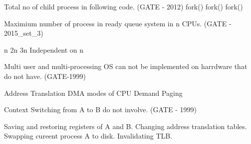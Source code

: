 
\begin{questyle}

  \question  Total no of child process in following code. (GATE - 2012) \newline
    fork()  \newline fork()  \newline  fork()

  \begin{oneparchoices}
  \end{oneparchoices}

\end{questyle}




\begin{questyle}

  \question Maximium number of process in ready queue system in n CPUs. (GATE - 2015\_set\_3)

  \begin{oneparchoices}
    \choice n
    \choice 2n
    \choice 3n
    \choice Independent on n
  \end{oneparchoices}

\end{questyle}





\begin{questyle}

  \question  Multi user and multi-processing OS can not be implemented on harrdware that do not have. (GATE-1999)

  \begin{oneparchoices}
    \choice Address Translation
    \choice DMA
     modes of CPU
    \choice Demand Paging
  \end{oneparchoices}

\end{questyle}




\begin{questyle}

  \question  Context Switching from A to B do not involve. (GATE - 1999)

  \begin{choices}
    \choice Saving and restoring registers of A and B.
    \choice Changing address translation tables.
    \choice Swapping cureent process A to disk.
    \choice Invalidating TLB.
  \end{choices}

\end{questyle}



